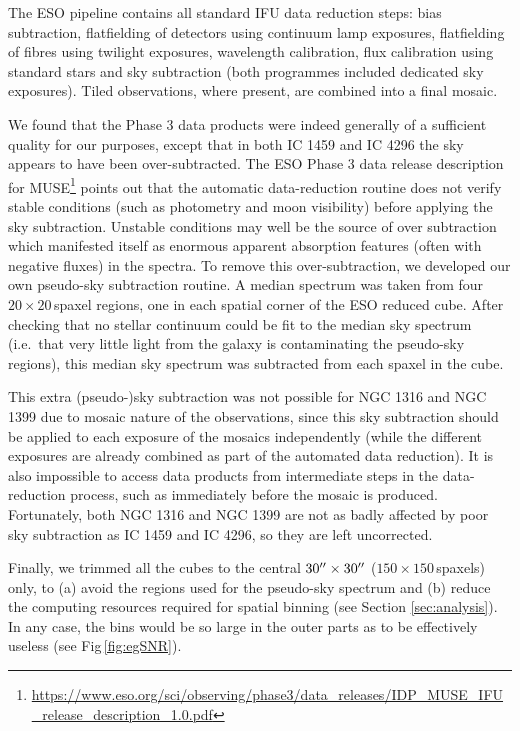 		The ESO pipeline contains all standard IFU data reduction steps: bias subtraction, flatfielding of detectors using continuum lamp exposures, flatfielding of fibres using twilight exposures, wavelength calibration, flux calibration using standard stars and sky subtraction (both programmes included dedicated sky exposures). Tiled observations, where present, are combined into a final mosaic.

		We found that the Phase 3 data products were indeed generally of a sufficient quality for our purposes, except that in both IC 1459 and IC 4296 the sky appears to have been over-subtracted. The ESO Phase 3 data release description for MUSE\footnote{\url{https://www.eso.org/sci/observing/phase3/data\_releases/IDP\_MUSE\_IFU\_release\_description\_1.0.pdf}} points out that the automatic data-reduction routine does not verify stable conditions (such as photometry and moon visibility) before applying the sky subtraction. Unstable conditions may well be the source of over subtraction which manifested itself as enormous apparent absorption features (often with negative fluxes) in the spectra. To remove this over-subtraction, we developed our own pseudo-sky subtraction routine. A median spectrum was taken from four $20 \times 20$\,spaxel regions, one in each spatial corner of the ESO reduced cube. After checking that no stellar continuum could be fit to the median sky spectrum (i.e.\ that very little light from the galaxy is contaminating the pseudo-sky regions), this median sky spectrum was subtracted from each spaxel in the cube. 

		This extra (pseudo-)sky subtraction was not possible for NGC 1316 and NGC 1399 due to mosaic nature of the observations, since this sky subtraction should be applied to each exposure of the mosaics independently (while the different exposures are already combined as part of the automated data reduction). It is also impossible to access data products from intermediate steps in the data-reduction process, such as immediately before the mosaic is produced. Fortunately, both NGC 1316 and NGC 1399 are not as badly affected by poor sky subtraction as IC 1459 and IC 4296, so they are left uncorrected. 

		Finally, we trimmed all the cubes to the central $30\hbox{$^{\prime\prime}$} \times 30\hbox{$^{\prime\prime}$}$ ($150 \times 150$\,spaxels) only, to (a) avoid the regions used for the pseudo-sky spectrum and (b) reduce the computing resources required for spatial binning (see Section \ref{sec:analysis}). In any case, the bins would be so large in the outer parts as to be effectively useless (see Fig\,\ref{fig:egSNR}).

